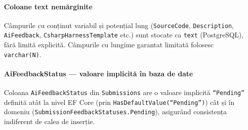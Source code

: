 \paragraph{Coloane text nemărginite}
Câmpurile cu conținut variabil și potențial lung (\texttt{SourceCode},
\texttt{Description}, \texttt{AiFeedback}, \texttt{CsharpHarnessTemplate}
etc.) sunt stocate ca \texttt{text} (PostgreSQL), fără limită explicită.
Câmpurile cu lungime garantat limitată folosesc \texttt{varchar(N)}.

\paragraph{AiFeedbackStatus — valoare implicită în baza de date}
Coloana \texttt{AiFeedbackStatus} din \texttt{Submissions} are o valoare
implicită \texttt{``Pending''} definită atât la nivel EF Core (prin
\texttt{HasDefaultValue(``Pending'')}) cât și în domeniu
(\texttt{SubmissionFeedbackStatuses.Pending}), asigurând consistența
indiferent de calea de inserție.
